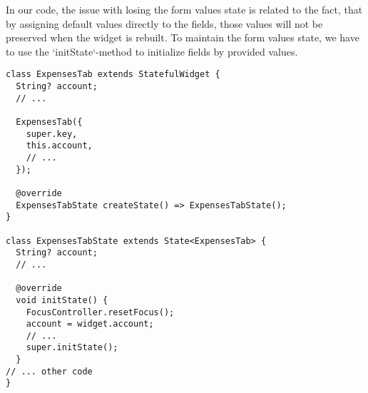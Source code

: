 In our code, the issue with losing the form values state is related to the fact, that by assigning default values 
directly to the fields, those values will not be preserved when the widget is rebuilt. To maintain the form values 
state, we have to use the `initState`-method to initialize fields by provided values.

\begin{lstlisting}
class ExpensesTab extends StatefulWidget {
  String? account;
  // ...

  ExpensesTab({
    super.key,
    this.account,
    // ...
  });

  @override
  ExpensesTabState createState() => ExpensesTabState();
}

class ExpensesTabState extends State<ExpensesTab> {
  String? account;
  // ...

  @override
  void initState() {
    FocusController.resetFocus();
    account = widget.account;
    // ...
    super.initState();
  }
// ... other code
}
\end{lstlisting}
